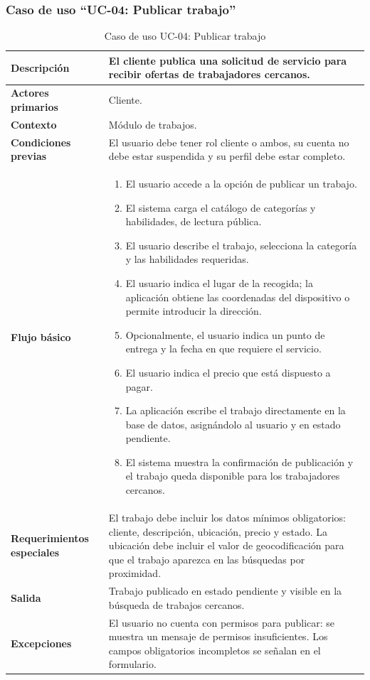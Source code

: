 \documentclass[doc,12pt,a4paper]{apa7}
\begin{document}
\subsubsection{Caso de uso ``UC-04: Publicar trabajo''}

\begin{longtable}{|P{3.3cm}|L{11.2cm}|}
\caption{Caso de uso UC-04: Publicar trabajo}\\
\hline
\textbf{Descripción} & El cliente publica una solicitud de servicio para recibir ofertas de trabajadores cercanos. \\ \hline
\textbf{Actores primarios} & Cliente. \\ \hline
\textbf{Contexto} & Módulo de trabajos. \\ \hline
\textbf{Condiciones previas} & El usuario debe tener rol cliente o ambos, su cuenta no debe estar suspendida y su perfil debe estar completo. \\ \hline
\textbf{Flujo básico} &
\begin{enumerate}
    \item El usuario accede a la opción de publicar un trabajo.
    \item El sistema carga el catálogo de categorías y habilidades, de lectura pública.
    \item El usuario describe el trabajo, selecciona la categoría y las habilidades requeridas.
    \item El usuario indica el lugar de la recogida; la aplicación obtiene las coordenadas del dispositivo o permite introducir la dirección.
    \item Opcionalmente, el usuario indica un punto de entrega y la fecha en que requiere el servicio.
    \item El usuario indica el precio que está dispuesto a pagar.
    \item La aplicación escribe el trabajo directamente en la base de datos, asignándolo al usuario y en estado pendiente.
    \item El sistema muestra la confirmación de publicación y el trabajo queda disponible para los trabajadores cercanos.
\end{enumerate} \\ \hline
\textbf{Requerimientos especiales} & El trabajo debe incluir los datos mínimos obligatorios: cliente, descripción, ubicación, precio y estado. La ubicación debe incluir el valor de geocodificación para que el trabajo aparezca en las búsquedas por proximidad. \\ \hline
\textbf{Salida} & Trabajo publicado en estado pendiente y visible en la búsqueda de trabajos cercanos. \\ \hline
\textbf{Excepciones} & El usuario no cuenta con permisos para publicar: se muestra un mensaje de permisos insuficientes. Los campos obligatorios incompletos se señalan en el formulario. \\ \hline
\end{longtable}
\end{document}
